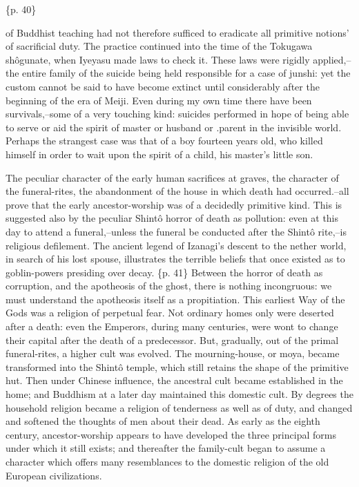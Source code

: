 \{p. 40\}

of Buddhist teaching had not therefore sufficed to eradicate all primitive notions' of sacrificial duty. The practice continued into the time of the Tokugawa shôgunate, when Iyeyasu made laws to check it. These laws were rigidly applied,--the entire family of the suicide being held responsible for a case of junshi: yet the custom cannot be said to have become extinct until considerably after the beginning of the era of Meiji. Even during my own time there have been survivals,--some of a very touching kind: suicides performed in hope of being able to serve or aid the spirit of master or husband or .parent in the invisible world. Perhaps the strangest case was that of a boy fourteen years old, who killed himself in order to wait upon the spirit of a child, his master's little son.



The peculiar character of the early human sacrifices at graves, the character of the funeral-rites, the abandonment of the house in which death had occurred.--all prove that the early ancestor-worship was of a decidedly primitive kind. This is suggested also by the peculiar Shintô horror of death as pollution: even at this day to attend a funeral,--unless the funeral be conducted after the Shintô rite,--is religious defilement. The ancient legend of Izanagi's descent to the nether world, in search of his lost spouse, illustrates the terrible beliefs that once existed as to goblin-powers presiding over decay. \{p. 41\} Between the horror of death as corruption, and the apotheosis of the ghost, there is nothing incongruous: we must understand the apotheosis itself as a propitiation. This earliest Way of the Gods was a religion of perpetual fear. Not ordinary homes only were deserted after a death: even the Emperors, during many centuries, were wont to change their capital after the death of a predecessor. But, gradually, out of the primal funeral-rites, a higher cult was evolved. The mourning-house, or moya, became transformed into the Shintô temple, which still retains the shape of the primitive hut. Then under Chinese influence, the ancestral cult became established in the home; and Buddhism at a later day maintained this domestic cult. By degrees the household religion became a religion of tenderness as well as of duty, and changed and softened the thoughts of men about their dead. As early as the eighth century, ancestor-worship appears to have developed the three principal forms under which it still exists; and thereafter the family-cult began to assume a character which offers many resemblances to the domestic religion of the old European civilizations.



